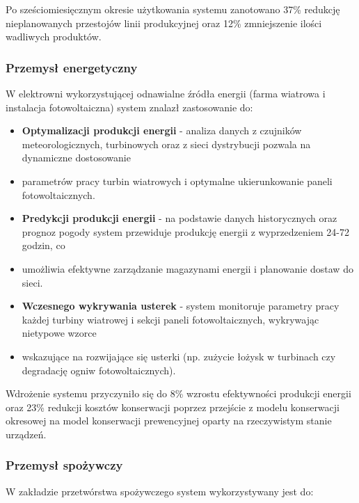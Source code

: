 Po sześciomiesięcznym okresie użytkowania systemu zanotowano 37\% redukcję nieplanowanych przestojów linii produkcyjnej oraz 12\% zmniejszenie ilości wadliwych produktów.

\subsubsection{Przemysł energetyczny}
\label{subsubsec:przemysl_energetyczny}

W elektrowni wykorzystującej odnawialne źródła energii (farma wiatrowa i instalacja fotowoltaiczna) system znalazł zastosowanie do:

\begin{itemize}
    \item \textbf{Optymalizacji produkcji energii} - analiza danych z czujników meteorologicznych, turbinowych oraz z sieci dystrybucji pozwala na dynamiczne dostosowanie
    \item parametrów pracy turbin wiatrowych i optymalne ukierunkowanie paneli fotowoltaicznych.
    \item \textbf{Predykcji produkcji energii} - na podstawie danych historycznych oraz prognoz pogody system przewiduje produkcję energii z wyprzedzeniem 24-72 godzin, co
    \item umożliwia efektywne zarządzanie magazynami energii i planowanie dostaw do sieci.
    \item \textbf{Wczesnego wykrywania usterek} - system monitoruje parametry pracy każdej turbiny wiatrowej i sekcji paneli fotowoltaicznych, wykrywając nietypowe wzorce
    \item wskazujące na rozwijające się usterki (np. zużycie łożysk w turbinach czy degradację ogniw fotowoltaicznych).
\end{itemize}

Wdrożenie systemu przyczyniło się do 8\% wzrostu efektywności produkcji energii oraz 23\% redukcji kosztów konserwacji poprzez przejście z modelu konserwacji okresowej na
model konserwacji prewencyjnej oparty na rzeczywistym stanie urządzeń.

\subsubsection{Przemysł spożywczy}
\label{subsubsec:przemysl_spozywczy}

W zakładzie przetwórstwa spożywczego system wykorzystywany jest do:

